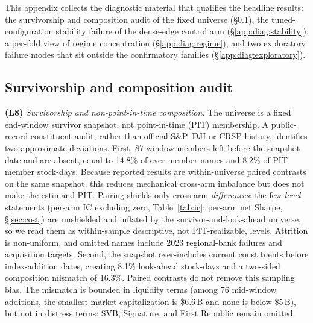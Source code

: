 \documentclass{article}
\begin{document}
This appendix collects the diagnostic material that qualifies the headline results: the survivorship and composition audit of the fixed universe (\S\ref{app:diag:survivorship}), the tuned-configuration stability failure of the dense-edge control arm (\S\ref{app:diag:stability}), a per-fold view of regime concentration (\S\ref{app:diag:regime}), and two exploratory failure modes that sit outside the confirmatory families (\S\ref{app:diag:exploratory}).

\subsection{Survivorship and composition audit}\label{app:diag:survivorship}

\textbf{(L8)} \emph{Survivorship and non-point-in-time composition.} The universe is a fixed end-window survivor snapshot, not point-in-time (PIT) membership. A public-record constituent audit, rather than official S\&P~DJI or CRSP history, identifies two approximate deviations. First, 87 window members left before the snapshot date and are absent, equal to 14.8\% of ever-member names and 8.2\% of PIT member stock-days. Because reported results are within-universe paired contrasts on the same snapshot, this reduces mechanical cross-arm imbalance but does not make the estimand PIT. Pairing shields only cross-arm \emph{differences}: the few \emph{level} statements (per-arm IC excluding zero, Table~\ref{tab:ic}; per-arm net Sharpe, \S\ref{sec:cost}) are unshielded and inflated by the survivor-and-look-ahead universe, so we read them as within-sample descriptive, not PIT-realizable, levels. Attrition is non-uniform, and omitted names include 2023 regional-bank failures and acquisition targets. Second, the snapshot over-includes current constituents before index-addition dates, creating 8.1\% look-ahead stock-days and a two-sided composition mismatch of 16.3\%. Paired contrasts do not remove this sampling bias. The mismatch is bounded in liquidity terms (among 76 mid-window additions, the smallest market capitalization is \$6.6\,B and none is below \$5\,B), but not in distress terms: SVB, Signature, and First Republic remain omitted.
\end{document}
